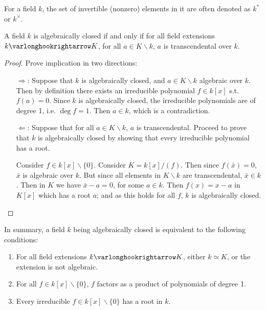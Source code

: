 \documentclass{article}
\begin{document}
\begin{notation}
    For a field $k$, the set of invertible (nonzero) elements in it are often denoted as $k^{\ast}$ or $k^{\times}$.
\end{notation}

\begin{proposition}
    A field $k$ is algebraically closed if and only if for all field extensions $k \ext K$, for all $a \in K \smallsetminus k$, $a$ is transcendental over $k$.
\end{proposition}

\begin{proof}
    Prove implication in two directions:
    \begin{itemize}
        \item[$\Rightarrow$:] Suppose that $k$ is algebraically closed, and $a \in K \smallsetminus k$ algebraic over $k$. Then by definition there exists an irreducible polynomial $f \in k[x]$ s.t. $f(a) = 0$. Since $k$ is algebraically closed, the irreducible polynomials are of degree 1, i.e. $\deg f = 1$. Then $a \in k$, which is a contradiction.
        \item[$\Leftarrow$:] Suppose that for all $a \in K \smallsetminus k$, $a$ is transcendental. Proceed to prove that $k$ is algebraically closed by showing that every irreducible polynomial has a root. 
        
        Consider $f \in k[x] \smallsetminus \{0\}$. Consider $K = k[x]/(f)$. Then since $f(\bar{x}) = 0$, $\bar{x}$ is algebraic over $k$. But since all elements in $K \smallsetminus k$ are transcendental, $\bar{x} \in k$. Then in $K$ we have $\bar{x} - a = 0$, for some $a \in k$. Then $f(x) = x - a$ in $K[x]$ which has a root $a$; and as this holds for all $f$, $k$ is algebraically closed.
    \end{itemize}
\end{proof}

\textstart
In summary, a field $k$ being algebraically closed is equivalent to the following conditions:
\begin{enumerate}[label=\arabic*)]
    \item For all field extensions $k \ext K$, either $k \simeq K$, or the extension is not algebraic. 
    \item For all $f \in k[x] \smallsetminus \{0\}$, $f$ factors as a product of polynomials of degree 1.
    \item Every irreducible $f \in k[x] \smallsetminus \{0\}$ has a root in $k$. 
\end{enumerate}
\end{document}
